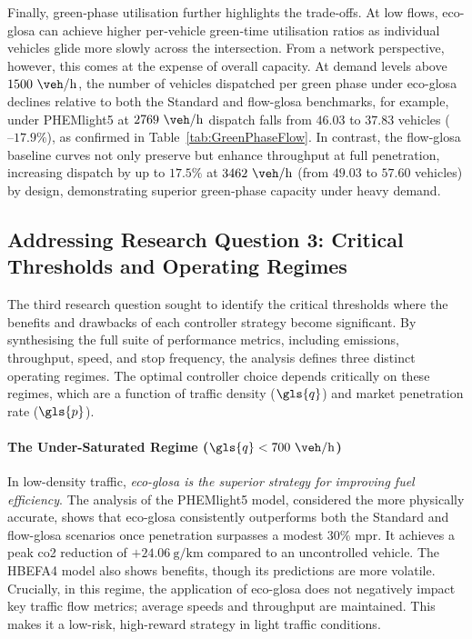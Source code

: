 Finally, green‐phase utilisation further highlights the trade‐offs. At low flows, \ac{eco-glosa} can achieve higher per‐vehicle green‐time utilisation ratios as individual vehicles glide more slowly across the intersection. From a network perspective, however, this comes at the expense of overall capacity. At demand levels above $1500~\unit{\veh\per\hour}$, the number of vehicles dispatched per green phase under \ac{eco-glosa} declines relative to both the Standard and \ac{flow-glosa} benchmarks, for example, under PHEMlight5 at $2769~\unit{\veh\per\hour}$ dispatch falls from $46.03$ to $37.83$ vehicles ($–17.9\%$), as confirmed in Table~\vref{tab:GreenPhaseFlow}. In contrast, the \ac{flow-glosa} baseline curves not only preserve but enhance throughput at full penetration, increasing dispatch by up to $17.5\%$ at $3462~\unit{\veh\per\hour}$ (from $49.03$ to $57.60$ vehicles) by design, demonstrating superior green‐phase capacity under heavy demand.

\subsection*{Addressing Research Question 3: Critical Thresholds and Operating Regimes}
The third research question sought to identify the critical thresholds where the benefits and drawbacks of each controller strategy become significant. By synthesising the full suite of performance metrics, including emissions, throughput, speed, and stop frequency, the analysis defines three distinct operating regimes. The optimal controller choice depends critically on these regimes, which are a function of traffic density ($\gls{q}$) and market penetration rate ($\gls{p}$).

\paragraph{The Under-Saturated Regime ($\gls{q} < 700~\unit{\veh\per\hour}$)}
In low-density traffic, \textit{\ac{eco-glosa} is the superior strategy for improving fuel efficiency}. The analysis of the PHEMlight5 model, considered the more physically accurate, shows that \ac{eco-glosa} consistently outperforms both the Standard and \ac{flow-glosa} scenarios once penetration surpasses a modest $30\%$ \ac{mpr}. It achieves a peak \ac{co2} reduction of $+24.06~\unit{\gram\per\kilo\metre}$ compared to an uncontrolled vehicle. The HBEFA4 model also shows benefits, though its predictions are more volatile. Crucially, in this regime, the application of \ac{eco-glosa} does not negatively impact key traffic flow metrics; average speeds and throughput are maintained. This makes it a low-risk, high-reward strategy in light traffic conditions.

